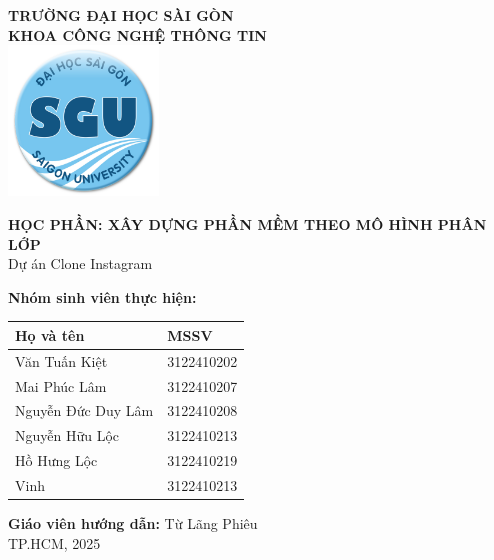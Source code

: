 \begin{titlepage}
    \centering
    {\LARGE \textbf{TRƯỜNG ĐẠI HỌC SÀI GÒN}} \\[0.2cm]
    {\Large \textbf{KHOA CÔNG NGHỆ THÔNG TIN}} \\[0.5cm]
    
    \vspace{0.5cm} 
    \includegraphics[width=4cm]{./img/logo.png} %
    \vspace{0.5cm} %
    
    {\Large \textbf{HỌC PHẦN: XÂY DỰNG PHẦN MỀM THEO MÔ HÌNH PHÂN LỚP}} \\[0.5cm]
    {\Large Dự án Clone Instagram} \\[0.5cm]

    \vspace{0.5cm} %
    
    \textbf{Nhóm sinh viên thực hiện:} \\[0.5cm]
    
    \begin{tabular}{|l|l|}
        \hline
        \textbf{Họ và tên} & \textbf{MSSV} \\ \hline
        Văn Tuấn Kiệt & 3122410202 \\ \hline
        Mai Phúc Lâm & 3122410207 \\ \hline
        Nguyễn Đức Duy Lâm & 3122410208 \\ \hline
        Nguyễn Hữu Lộc & 3122410213 \\ \hline
        Hồ Hưng Lộc & 3122410219 \\ \hline
        Vinh & 3122410213 \\ \hline
    \end{tabular}

    \vspace{0.5cm}

    \textbf{Giáo viên hướng dẫn:} Từ Lãng Phiêu \\[0.5cm]
    
    \vfill
    {\Large TP.HCM, 2025}
\end{titlepage}

